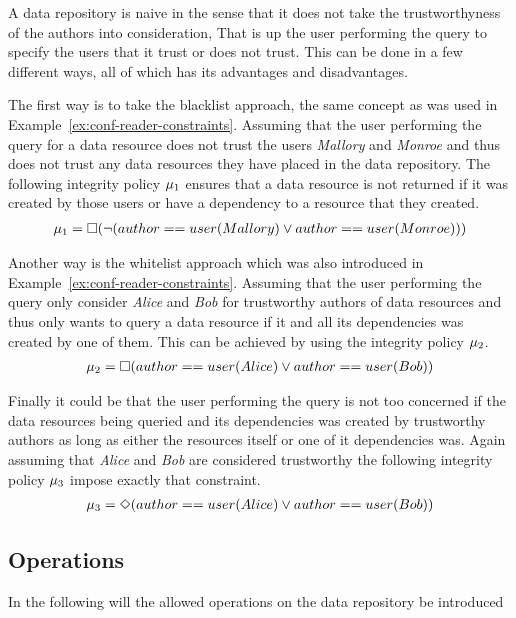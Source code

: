 \begin{example}
A data repository is naive in the sense that it does not take the trustworthyness of the authors into consideration, That is up the user performing the query to specify the users that it trust or does not trust. This can be done in a few different ways, all of which has its advantages and disadvantages.

The first way is to take the blacklist approach, the same concept as was used in Example~\ref{ex:conf-reader-constraints}. Assuming that the user performing the query for a data resource does not trust the users \emph{Mallory} and \emph{Monroe} and thus does not trust any data resources they have placed in the data repository. The following integrity policy $\mu_1$ ensures that a data resource is not returned if it was created by those users or have a dependency to a resource that they created.
\begin{align*}
    \mu_1 = \square( \lnot (author==user(Mallory) \lor author==user(Monroe)))
\end{align*}

Another way is the whitelist approach which was also introduced in Example~\ref{ex:conf-reader-constraints}. Assuming that the user performing the query only consider \emph{Alice} and \emph{Bob} for trustworthy authors of data resources and thus only wants to query a data resource if it and all its dependencies was created by one of them. This can be achieved by using the integrity policy $\mu_2$.
\begin{align*}
    \mu_2 = \square(author==user(Alice) \lor author==user(Bob))
\end{align*}

Finally it could be that the user performing the query is not too concerned if the data resources being queried and its dependencies was created by trustworthy authors as long as either the resources itself or one of it dependencies was. Again assuming that \emph{Alice} and \emph{Bob} are considered trustworthy the following integrity policy $\mu_3$ impose exactly that constraint.
\begin{align*}
    \mu_3 = \Diamond(author==user(Alice) \lor author==user(Bob))
\end{align*}

\end{example}

\subsection{Operations}
In the following will the allowed operations on the data repository be introduced
